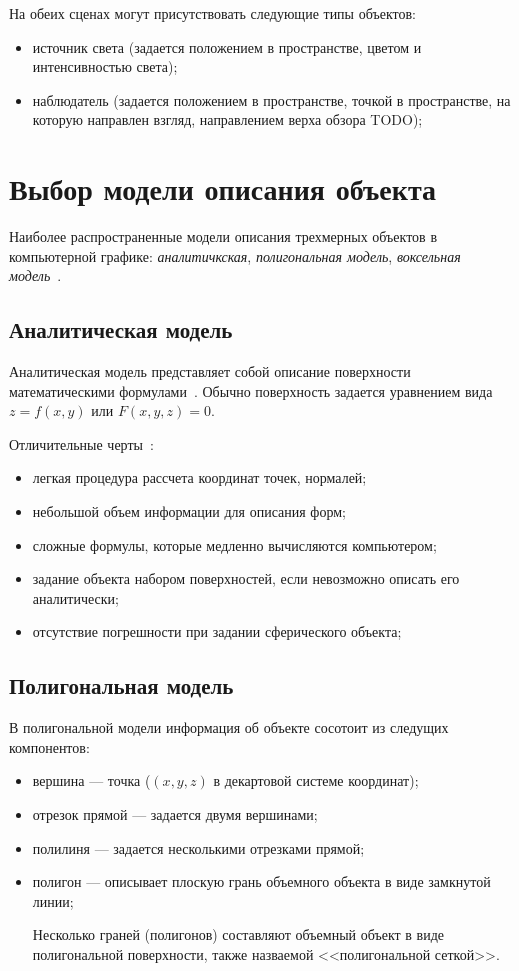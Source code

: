     На обеих сценах могут присутствовать следующие типы объектов:
    \begin{itemize}
    	\item источник света (задается положением в пространстве, цветом и интенсивностью света);
    	\item наблюдатель (задается положением в пространстве, точкой в пространстве, на которую направлен взгляд, направлением верха обзора TODO);
    \end{itemize}
    
    \section{Выбор модели описания объекта}
    Наиболее распространенные модели описания трехмерных объектов в компьютерной графике: \textit{аналитичкская}, \textit{полигональная модель}, \textit{воксельная модель}~\cite{porev}.
    
    \subsection{Аналитическая модель}
    Аналитическая модель представляет собой описание поверхности математическими формулами~\cite{porev}. Обычно поверхность задается уравнением вида $z=f(x,y)$ или $F(x,y,z)=0$.
    
    Отличительные черты~\cite{porev}:
    \begin{itemize}
    	\item легкая процедура рассчета координат точек, нормалей;
    	\item небольшой объем информации для описания форм;
    	\item сложные формулы, которые медленно вычисляются компьютером;
    	
    	\item задание объекта набором поверхностей, если невозможно описать его аналитически;
    	\item отсутствие погрешности при задании сферического объекта; 
    \end{itemize}
    
    \subsection{Полигональная модель}
    В полигональной модели информация об объекте сосотоит из следущих компонентов:
    \begin{itemize}
	\item вершина --- точка ($(x, y, z)$ в декартовой системе координат);
	\item отрезок прямой --- задается двумя вершинами;
	\item полилиня --- задается несколькими отрезками прямой;
	\item полигон --- описывает плоскую грань объемного объекта в виде замкнутой линии;
	
	Несколько граней (полигонов) составляют объемный объект в виде полигональной поверхности, также назваемой <<полигональной сеткой>>.
    \end{itemize}
    
